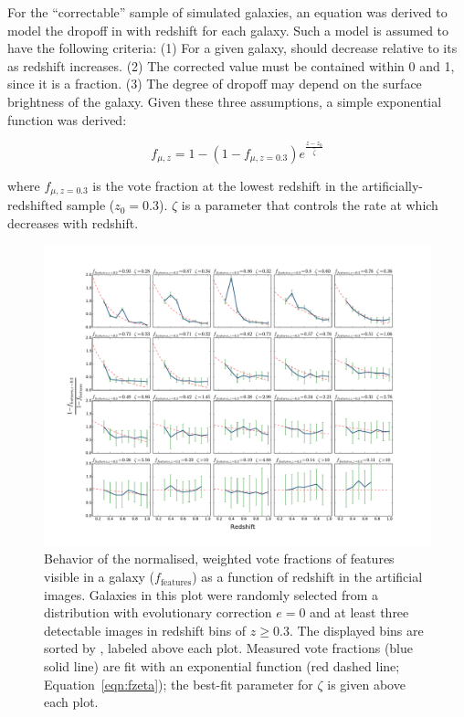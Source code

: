 For the ``correctable'' sample of simulated \ferengi{} galaxies, an equation was derived to model the dropoff in \ffeatures{} with redshift for each galaxy. Such a model is assumed to have the following criteria: (1) For a given galaxy, \ffeatures{} should decrease relative to its \ffeaturesrest{} as redshift increases. (2) The corrected \ffeatures{} value must be contained within 0 and 1, since it is a fraction. (3) The degree of dropoff may depend on the surface brightness of the galaxy. Given these three assumptions, a simple exponential function was derived:

\begin{equation}
f_{\mu,z} = 1 - (1 - f_{\mu,z=0.3})e^{\frac{z-z_0}{\hat\zeta}}
\label{eqn:fzeta}
\end{equation}

where $f_{\mu,z=0.3}$ is the vote fraction at the lowest redshift in the artificially-redshifted \ferengi{} sample ($z_{0}=0.3$). $\zeta$ is a parameter that controls the rate at which \ffeatures{} decreases with redshift. 

\begin{figure}
\center
\includegraphics[width=\textwidth]{figures/zeta_examples_sorted.pdf}
\caption{Behavior of the normalised, weighted vote fractions of features
visible in a galaxy ($f_\textrm{features}$) as a function of redshift in the
artificial \ferengi{} images. Galaxies in this plot were randomly selected from
a distribution with evolutionary correction $e=0$ and at least three detectable images 
in redshift bins of $z\ge0.3$. The displayed bins are sorted by \ffeaturesrest, 
labeled above each plot. Measured vote fractions (blue
solid line) are fit with an exponential function (red dashed line;
Equation~\ref{eqn:fzeta}); the best-fit parameter for $\zeta$ is given above
each plot.}


\label{fig:zeta_examples}
\end{figure}




